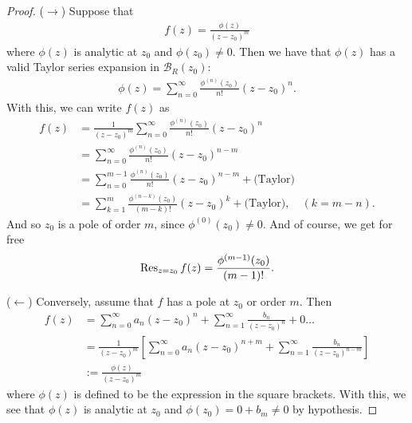 \documentclass{article}
\theoremstyle{definition}
\newcommand{\f}[2]{\frac{#1}{#2}}
\newcommand{\lb}{\left[}
\newcommand{\rb}{\right]}
\begin{document}
\begin{proof}
	($\rightarrow$) Suppose that 
	\begin{align}
	f(z) = \f{\phi(z)}{(z-z_0)^m}
	\end{align}
	where $\phi(z)$ is analytic at $z_0$ and $\phi(z_0) \neq 0$. Then we have that $\phi(z)$ has a valid Taylor series expansion in $\mathcal{B}_R(z_0)$:
	\begin{align}
	\phi(z) = \sum^\infty_{n=0} \f{\phi^{(n)}(z_0)}{n!}(z- z_0)^n.
	\end{align} 
	With this, we can write $f(z)$ as
	\begin{align}
	f(z) &= \f{1}{(z-z_0)^m} \sum^\infty_{n=0}\f{\phi^{(n)}(z_0)}{n!}(z-z_0)^n\nonumber\\
	&= \sum^\infty_{n=0}\f{\phi^{(n)}(z_0)}{n!}(z-z_0)^{n-m}\nonumber\\
	&= \sum^{m-1}_{n=0}\f{\phi^{(n)}(z_0)}{n!}(z-z_0)^{n-m} + \text{(Taylor)}\nonumber\\
	&= \sum^{m}_{k=1}\f{\phi^{(n-k)}(z_0)}{(m-k)!}(z-z_0)^{k} + \text{(Taylor)}, \quad (k= m-n).
	\end{align}
	And so $z_0$ is a pole of order $m$, since $\phi^{(0)}(z_0) \neq 0$. And of course, we get for free
	\begin{align}
	\Res_{z = z_0} f(z) = \f{\phi^{(m-1)}(z_0)}{(m-1)!}.
	\end{align}
	
 	($\leftarrow$) Conversely, assume that $f$ has a pole at $z_0$ or order $m$. Then 
 	\begin{align}
 	f(z) &= \sum^\infty_{n=0}a_n(z-z_0)^n + \sum^\infty_{n=1} \f{b_n}{(z - z_0)^n} + 0 \dots\nonumber\\
 	&= \f{1}{(z-z_0)^m}\lb \sum^\infty_{n=0}a_n(z-z_0)^{n+m} + \sum^\infty_{n=1} \f{b_n}{(z - z_0)^{n-m}}   \rb\nonumber\\
 	&:= \f{\phi(z)}{(z - z_0)^m}
 	\end{align}
 	where $\phi(z)$ is defined to be the expression in the square brackets. With this, we see that $\phi(z)$ is analytic at $z_0$ and $\phi(z_0) = 0 + b_m \neq 0 $ by hypothesis. \qedhere
\end{proof}
\end{document}
